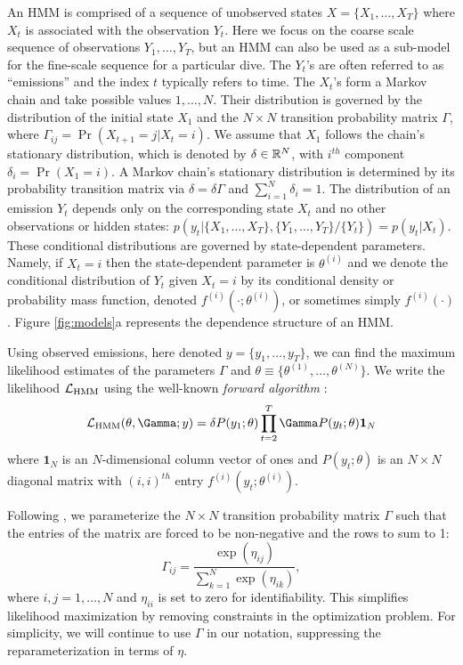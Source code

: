 An HMM is comprised of a sequence of unobserved states $X = \big\{X_1, \ldots, X_T\big\}$ where $X_t$ is associated with the observation $Y_t$. Here we focus on the coarse scale sequence of observations $Y_1,\ldots, Y_T$, but an HMM can also be used as a sub-model for the fine-scale sequence for a particular dive. The $Y_t$'s are often referred to as ``emissions'' and the index $t$ typically refers to time. 
The $X_t$'s form a Markov chain and take possible values $1, \ldots, N$. Their distribution is governed by the distribution of the initial state $X_1$ and the $N \times N$ transition probability matrix $\Gamma$, where $\Gamma_{ij} = \Pr(X_{t+1} = j | X_t = i)$. 
%
We assume that $X_1$ follows the chain's stationary distribution, which is denoted by $\delta \in \mathbb{R}^N$, with $i^{th}$ component
$\delta_i = \Pr(X_1 = i).$
A Markov chain's stationary distribution is determined by its probability transition matrix via $\delta = \delta \Gamma$ and $\sum_{i=1}^N \delta_i = 1$.
%
The distribution of an emission $Y_t$ depends only on the corresponding state $X_t$ and no other observations or hidden states: $p\left(y_t|\{X_1,\ldots, X_T\},\{Y_1,\ldots, Y_T\}/ \{Y_t\}\right) = p(y_t|X_t)$.
%
These conditional distributions are governed by state-dependent parameters. Namely, if $X_t = i$ then the state-dependent parameter is $\theta^{(i)}$ and we denote the conditional distribution of $Y_t$ given $X_t=i$ by its conditional density or probability mass function, denoted $f^{(i)}(\cdot ; \theta^{(i)})$, or sometimes simply $f^{(i)}(\cdot)$.
%
Figure \ref{fig:models}a represents the dependence structure of an HMM.

Using observed emissions, here denoted $y = \{y_1,\ldots,y_T\}$, we can find the maximum likelihood estimates of the parameters $\Gamma$ and $\theta \equiv \{\theta^{(1)},\ldots,\theta^{(N)}\}$. We write the likelihood $\mathcal{L}_{\text{HMM}}$ using the  well-known \textit{forward algorithm} \citep{Zucchini:2016}:
%
$$\calL_{\text{HMM}}(\theta,\Gamma;y) = \delta P(y_1;\theta) \prod_{t=2}^T \Gamma P(y_t;\theta) \mathbf{1}_N$$
%
where $\mathbf{1}_N$ is an $N$-dimensional column vector of ones and
%
$P(y_t;\theta)$ is an $N \times N$ diagonal matrix with $(i,i)^{th}$ entry  $f^{(i)}(y_t; \theta^{(i)})$.
%

Following \citet{Barajas:2017}, we parameterize the $N \times N$ transition probability matrix $\Gamma$ such that the entries of the matrix are forced to be non-negative and the rows to sum to 1:
%
\[
\Gamma_{ij} = \frac{\exp(\eta_{ij})}{\sum_{k=1}^N \exp(\eta_{ik})}, 
\]
%
where $i,j = 1,\ldots,N$ and $\eta_{ii}$ is set to zero for identifiability. This simplifies likelihood maximization by removing constraints in the optimization problem. For simplicity, we will continue to use $\Gamma$ in our notation, suppressing the reparameterization in terms of $\eta$.

